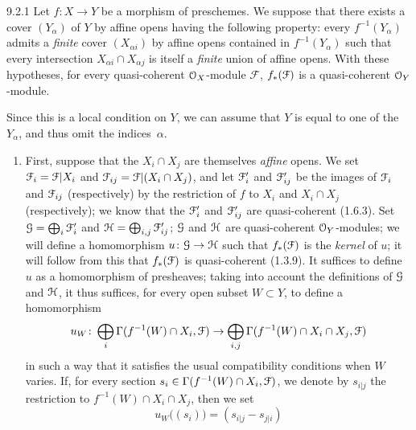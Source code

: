 \documentclass[../main.tex]{subfiles}
\begin{document}
\begin{cx}[Proposition]{9.2.1}
    Let $f\colon X\to Y$ be a morphism of preschemes.
    We suppose that there exists a cover $(Y_\alpha)$ of $Y$ by affine opens having the following property: every $f^{-1}(Y_\alpha)$ admits a \emph{finite} cover $(X_{\alpha i})$ by affine opens contained in $f^{-1}(Y_\alpha)$ such that every intersection $X_{\alpha i}\cap X_{\alpha j}$ is itself a \emph{finite} union of affine opens.
    With these hypotheses, for every quasi-coherent $\mathcal{O}_X$-module $\mathscr{F}$, $f_*(\mathcal{F})$ is a quasi-coherent $\mathcal{O}_Y$-module.
\end{cx}

Since this is a local condition on $Y$, we can assume that $Y$ is equal to one of the $Y_\alpha$, and thus omit the indices~$\alpha$.

\begin{enumerate}[label=\alph*)]
    \item First, suppose that the $X_i\cap X_j$ are themselves \emph{affine} opens.
        We set $\mathcal{F}_i=\mathcal{F}|X_i$ and $\mathcal{F}_{ij}=\mathcal{F}|(X_i\cap X_j)$, and let $\mathcal{F}'_i$ and $\mathcal{F}'_{ij}$ be the images of $\mathcal{F}_i$ and $\mathcal{F}_{ij}$ (respectively) by the restriction of $f$ to $X_i$ and $X_i\cap X_j$ (respectively); we know that the $\mathcal{F}'_i$ and $\mathcal{F}'_{ij}$ are quasi-coherent (1.6.3).
        Set $\mathcal{G}=\bigoplus_i\mathcal{F}'_i$ and $\mathcal{H}=\bigoplus_{i,j}\mathcal{F}'_{ij}$; $\mathcal{G}$ and $\mathcal{H}$ are quasi-coherent $\mathcal{O}_Y$-modules; we will define a homomorphism $u\colon\mathcal{G}\to\mathcal{H}$ such that $f_*(\mathcal{F})$ is the \emph{kernel} of $u$; it will follow from this that $f_*(\mathcal{F})$ is quasi-coherent (1.3.9).
        It suffices to define $u$ as a homomorphism of presheaves; taking into account the definitions of $\mathcal{G}$ and $\mathcal{H}$, it thus suffices, for every open subset $W\subset Y$, to define a homomorphism
        \begin{equation*}
            u_W\colon \bigoplus_i\Gamma(f^{-1}(W)\cap X_i, \mathcal{F}) \to \bigoplus_{i,j}\Gamma(f^{-1}(W)\cap X_i\cap X_j, \mathcal{F})
        \end{equation*}
        in such a way that it satisfies the usual compatibility conditions when $W$ varies.
        If, for every section $s_i\in\Gamma(f^{-1}(W)\cap X_i, \mathcal{F})$, we denote by $s_{i|j}$ the restriction to $f^{-1}(W)\cap X_i\cap X_j$, then we set
        \begin{equation*}
            u_W\big((s_i)\big) = (s_{i|j}-s_{j|i})

\end{equation*}
\end{enumerate}
\end{document}
